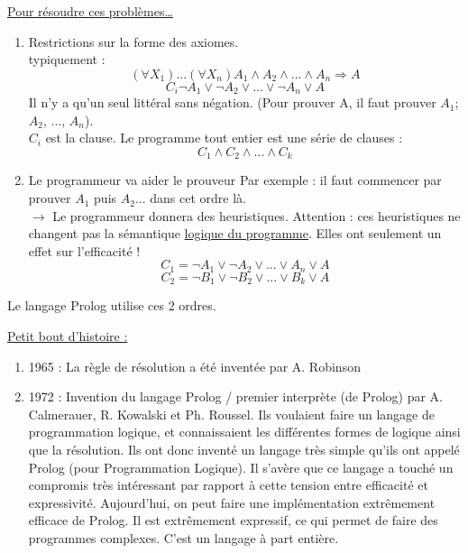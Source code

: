 \underline{Pour résoudre ces problèmes…}
\begin{enumerate}
	\item Restrictions sur la forme des axiomes.\\
	typiquement : 
	\begin{equation}
		(\forall X_{1}) ... (\forall X_{n}) A_{1} \wedge A_{2} \wedge ... \wedge A_{n} \Rightarrow A
	\end{equation}
	\begin{equation}
		C_{i} \neg A_{1} \vee \neg A_{2} \vee ... \vee \neg A_{n} \vee A
	\end{equation}
	Il n’y a qu’un seul littéral sans négation. (Pour prouver A, il faut prouver $A_{1}$; $A_{2}$, ..., $A_{n}$).\\
	$C_{i}$ est la clause. Le programme tout entier est une série de clauses :
	\begin{equation}
		C_{1} \wedge C_{2} \wedge ... \wedge C_{k}
	\end{equation}
	\item Le programmeur va aider le prouveur
	Par exemple : il faut commencer par prouver $A_{1}$ puis $A_{2}$... dans cet ordre là.\\
	$\rightarrow$ Le programmeur donnera des heuristiques. Attention : ces heuristiques ne changent pas la sémantique \underline{logique du programme}. Elles ont seulement un effet sur l’efficacité !
	\begin{equation}
		C_{1} = \neg A_{1} \vee \neg A_{2} \vee ... \vee A_{n} \vee A
	\end{equation}
	\begin{equation}
		C_{2} = \neg B_{1} \vee \neg B_{2} \vee ... \vee B_{k} \vee A
	\end{equation}
\end{enumerate}

Le langage Prolog utilise ces 2 ordres.

\underline{Petit bout d'histoire :}
\begin{enumerate}
	\item 1965 : 	La règle de résolution a été inventée par A. Robinson
	\item 1972 :	Invention du langage Prolog / premier interprète (de Prolog) par A. Calmerauer, R. Kowalski et Ph. Roussel. 
Ils voulaient faire un langage de programmation logique, et connaissaient les différentes formes de logique ainsi que la résolution. Ils ont donc inventé un langage très simple qu'ils ont appelé Prolog (pour Programmation Logique).  Il s'avère que ce langage a touché un compromis très intéressant par rapport à cette tension entre efficacité et expressivité.
Aujourd'hui, on peut faire une implémentation extrêmement efficace de Prolog. Il est extrêmement expressif, ce qui permet de faire des programmes complexes. C’est un langage à part entière.
\end{enumerate}

